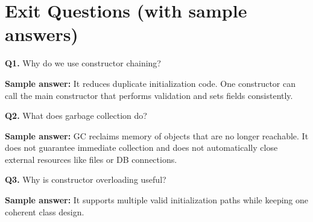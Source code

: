 \documentclass[11pt]{article}
\begin{document}
\section{Exit Questions (with sample answers)}
\textbf{Q1.} Why do we use constructor chaining?\par
\textbf{Sample answer:} It reduces duplicate initialization code. One constructor can call the main constructor that performs validation and sets fields consistently.

\vspace{0.6em}
\textbf{Q2.} What does garbage collection do?\par
\textbf{Sample answer:} GC reclaims memory of objects that are no longer reachable. It does not guarantee immediate collection and does not automatically close external resources like files or DB connections.

\vspace{0.6em}
\textbf{Q3.} Why is constructor overloading useful?\par
\textbf{Sample answer:} It supports multiple valid initialization paths while keeping one coherent class design.
\end{document}
